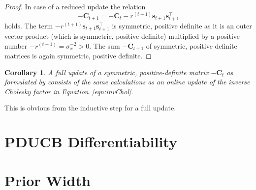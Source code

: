 \documentclass[11pt,a4paper,twoside,BCOR=15mm]{scrbook}
\newtheorem{corollary}{Corollary}
\newcommand{\vc}[1]{\bm{#1}}
\newcommand{\mat}[1]{\bm{#1}}
\newcommand{\Tr}{^{\top}}
\begin{document}
\begin{proof}
    In case of a reduced update the relation
    \begin{equation*}
        -\mat C_{t+1} = -\mat C_t - r^{(t+1)} \vc s_{t+1} \vc s_{t+1}\Tr
    \end{equation*}
    holds. The term $- r^{(t+1)} \vc s_{t+1} \vc s_{t+1}\Tr$ is symmetric, 
    positive definite as it is an outer vector product (which is symmetric, 
    positive definite) multiplied by a positive number $-r^{(t+1)} 
    = \sigma_x^{-2} > 0$. The sum $-\mat C_{t+1}$ of symmetric, positive 
    definite matrices is again symmetric, positive definite.
\end{proof}

\begin{corollary}
    A full update of a symmetric, positive-definite matrix $-\mat{C}_t$ as 
    formulated by \textcite[equation~2.9]{Csato:2002fp} consists of the same 
    calculations as an online update of the inverse Cholesky factor in 
    Equation~\ref{eqn:invChol}.
\end{corollary}
This is obvious from the inductive step for a full update.

\chapter{PDUCB Differentiability}\label{sec:pducb-diff}

\chapter{Prior Width}\label{sec:prior}

\backmatter{}
\listoffigures{}
\printbibliography{}
\end{document}
